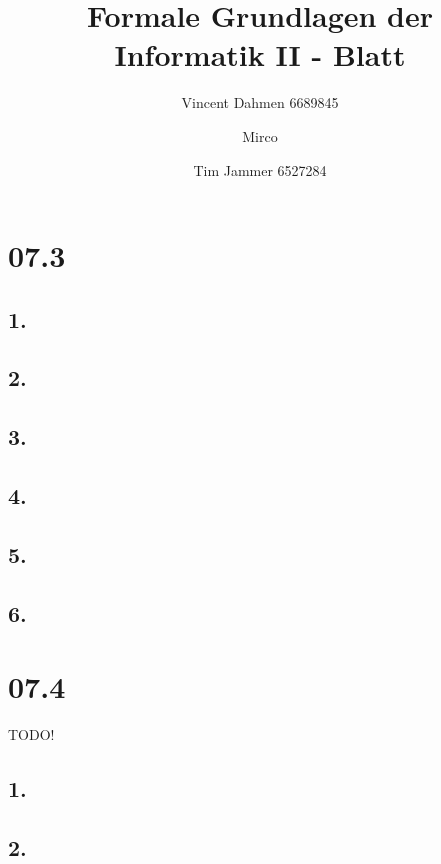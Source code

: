 \documentclass[12pt,a4paper]{article}
\title{Formale Grundlagen der Informatik II - Blatt \blattNr}
\author{Vincent Dahmen 6689845  \and Mirco \and Tim Jammer 6527284}
\def \blattNr{07}
\begin{document}
\maketitle{}

\section*{\blattNr .3}
\subsection*{1.}


\subsection*{2.}


\subsection*{3.}


\subsection*{4.}


\subsection*{5.}


\subsection*{6.}


\pagebreak

\section*{\blattNr .4}

TODO!
\subsection*{1.}
%

%
%
\subsection*{2.}
%
%
\end{document}
